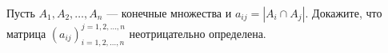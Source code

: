 \documentclass{article}
\begin{document}
Пусть $A_1, A_2, \ldots, A_n$ --- конечные множества и $a_{ij} = |A_i \cap A_j|$. Докажите, что матрица $(a_{ij})_{i=1,2,\ldots,n}^{j=1,2,\ldots,n}$ неотрицательно определена.
\end{document}
